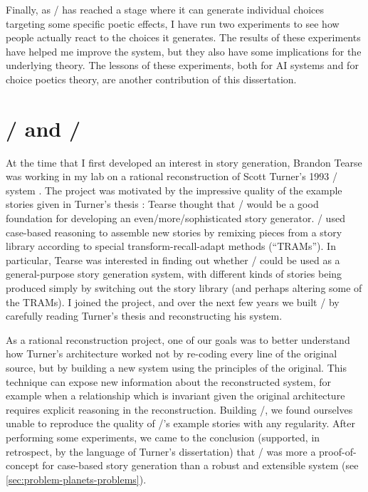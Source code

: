 Finally, as \dunyazad/ has reached a stage where it can generate individual choices targeting some specific poetic effects, I have run two experiments to see how people actually react to the choices it generates.
%
The results of these experiments have helped me improve the system, but they also have some implications for the underlying theory.
%
The lessons of these experiments, both for AI systems and for choice poetics theory, are another contribution of this dissertation.



\section{\minstrel/ and \skald/}

At the time that I first developed an interest in story generation, Brandon Tearse was working in my lab on a rational reconstruction of Scott Turner's 1993 \minstrel/ system \citep{Turner1993}.
%
The project was motivated by the impressive quality of the example stories given in Turner's thesis \citep{Turner1993}: Tearse thought that \minstrel/ would be a good foundation for developing an even\-/more\-/sophisticated story generator.
%
\minstrel/ used case-based reasoning to assemble new stories by remixing pieces from a story library according to special transform-recall-adapt methods (``TRAMs'').
%
In particular, Tearse was interested in finding out whether \minstrel/ could be used as a general-purpose story generation system, with different kinds of stories being produced simply by switching out the story library (and perhaps altering some of the TRAMs).
%
I joined the project, and over the next few years we built \skald/ by carefully reading Turner's thesis and reconstructing his system.


As a rational reconstruction project, one of our goals was to better understand how Turner's architecture worked not by re-coding every line of the original source, but by building a new system using the principles of the original.
%
This technique can expose new information about the reconstructed system, for example when a relationship which is invariant given the original architecture requires explicit reasoning in the reconstruction.
%
Building \skald/, we found ourselves unable to reproduce the quality of \minstrel/'s example stories with any regularity.
%
After performing some experiments, we came to the conclusion (supported, in retrospect, by the language of Turner's dissertation) that \minstrel/ was more a proof-of-concept for case-based story generation than a robust and extensible system (see \cref{sec:problem-planets-problems}).


